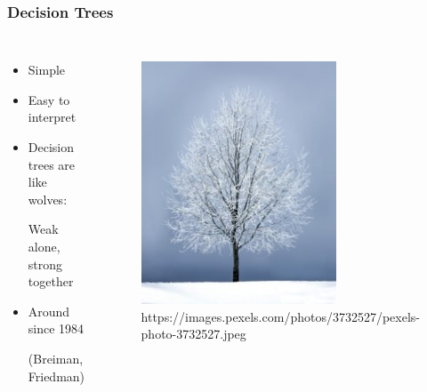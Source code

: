 \documentclass[
    utf8,
    aspectratio=169
]{beamer}  %
\begin{document}
\begin{frame}
	\frametitle{Decision Trees}
	\begin{columns}[onlytextwidth]
		\begin{itemize}
			\item Simple		
			\item Easy to interpret
			\item Decision trees are like wolves:
			
			Weak alone, strong together
			\item Around since 1984 
			
			(Breiman, Friedman)
		\end{itemize}
		
		\begin{figure}
			\includegraphics[width=0.7\textwidth]{pics/real_tree.jpg}
	        \tiny{https://images.pexels.com/photos/3732527/pexels-photo-3732527.jpeg}
		\end{figure}
	\end{columns}
\end{frame}
\end{document}
